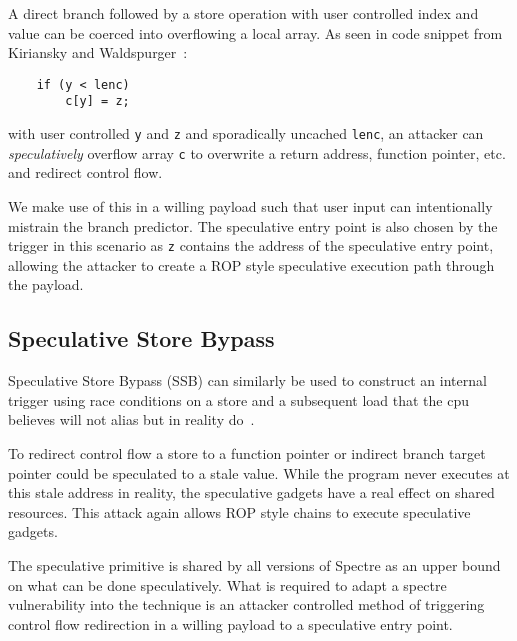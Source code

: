 A direct branch followed by a store operation with user controlled index and
value can be coerced into overflowing a local array. 
As seen in code snippet from Kiriansky and Waldspurger~\cite{kiriansky2018speculative}:
\begin{lstlisting}
    if (y < lenc)
        c[y] = z;
\end{lstlisting}
with user controlled 
\texttt{y} and \texttt{z} and sporadically uncached \texttt{lenc}, an attacker 
can \textit{speculatively} overflow array \texttt{c}
to overwrite a return address, function pointer, etc. and redirect control flow.

 

We make use of this in a willing payload such that user input can intentionally 
mistrain the branch predictor. The speculative entry point is also chosen by the 
trigger in this scenario as \texttt{z} contains the address of the 
speculative entry point, allowing the attacker to create a ROP style speculative 
execution path through the payload.


\subsection{Speculative Store Bypass}

Speculative Store Bypass (SSB) can similarly be used to construct an internal trigger
using race conditions on a store and a subsequent load that the cpu believes 
will not alias but in reality do~\cite{spec-store-bypass}.

To redirect control flow a store to a function pointer or indirect branch 
target pointer could be speculated to a stale value. While the program never 
executes at this stale address in reality, the speculative gadgets have a 
real effect on shared resources. This attack again allows ROP style 
chains to execute speculative gadgets.

The speculative primitive is shared by all versions of Spectre as an upper
bound on what can be done speculatively. What is required to adapt a spectre 
vulnerability into the \speculake technique is an attacker controlled method of 
triggering control flow redirection in a willing payload to a speculative entry point. 

